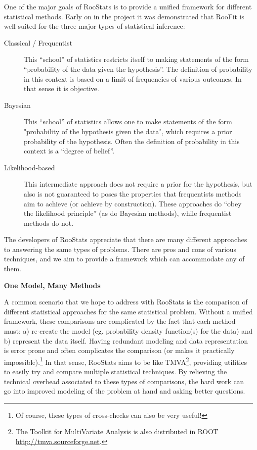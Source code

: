 \documentclass[11pt]{article}
\begin{document}
One of the major goals of RooStats is to provide a unified framework for different statistical methods.  Early on in the project it was demonstrated that RooFit is well suited for the three major types of statistical inference:
\begin{description}
 \item[Classical / Frequentist] This ``school'' of statistics restricts itself to making statements of the form ``probability of the data given the hypothesis''.  The definition of probability in this context is based on a limit of frequencies of various outcomes.  In that sense it is objective.
 \item[Bayesian] This ``school'' of statistics allows one to make statements of the form "probability of the hypothesis given the data", which requires a prior probability of the hypothesis.  Often the definition of probability in this context is a ``degree of belief''.  
 \item[Likelihood-based] This intermediate approach does not require a prior for the hypothesis, but also is not guaranteed to poses the properties that frequentists methods aim to achieve (or achieve by construction).  These approaches do ``obey the likelihood principle'' (as do Bayesian methods), while frequentist methods do not. 
\end{description}
The developers of RooStats appreciate that there are many different approaches to answering the same types of problems.  There are pros and cons of various techniques, and we aim to provide a framework which can accommodate any of them.

{\flushleft \textbf{One Model, Many Methods}}

A common scenario that we hope to address with RooStats is the comparison of different statistical approaches for the same statistical problem.  Without a unified framework, these comparisons are complicated by the fact that each method must: a) re-create the model (eg. probability density function(s) for the data) and b) represent the data itself.  Having redundant modeling and data representation is error prone and often complicates the comparison (or makes it practically impossible).\footnote{Of course, these types of cross-checks can also be very useful! }  In that sense, RooStats aims to be like TMVA\footnote{The Toolkit for MultiVariate Analysis is also distributed in ROOT \url{http://tmva.sourceforge.net}.}, providing utilities to easily try and compare multiple statistical techniques.  By relieving the technical overhead associated to these types of comparisons, the hard work can go into improved modeling of the problem at hand and asking better questions.
\end{document}
